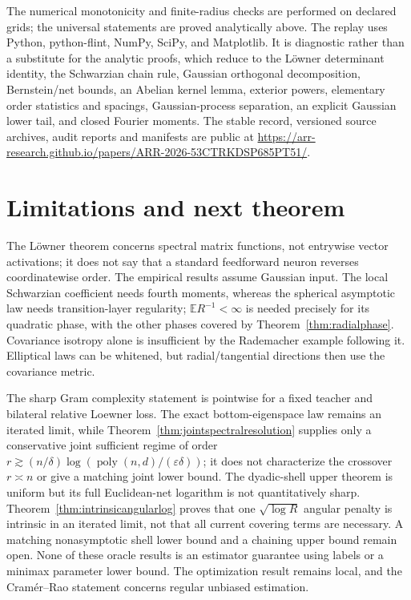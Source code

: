 \documentclass[11pt]{article}
\newcommand{\E}{\mathbb E}
\begin{document}
The numerical monotonicity and finite-radius checks are performed on declared grids; the universal statements are
proved analytically above.  The replay uses Python, python-flint, NumPy, SciPy, and Matplotlib.  It is diagnostic
rather than a substitute for
the analytic proofs, which reduce to the L\"owner determinant identity, the Schwarzian chain rule, Gaussian
orthogonal decomposition, Bernstein/net bounds, an Abelian kernel lemma, exterior powers, elementary order
statistics and spacings, Gaussian-process separation, an explicit Gaussian lower tail, and closed Fourier moments.
The stable record, versioned source archives, audit reports and manifests are public at
\url{https://arr-research.github.io/papers/ARR-2026-53CTRKDSP685PT51/}.

\section{Limitations and next theorem}

The L\"owner theorem concerns spectral matrix functions, not entrywise vector activations; it does not say that a
standard feedforward neuron reverses coordinatewise order.  The empirical results assume Gaussian input.  The
local Schwarzian coefficient needs fourth moments, whereas the spherical asymptotic law needs transition-layer
regularity; $\E R^{-1}<\infty$ is needed precisely for its quadratic phase, with the other phases covered by
Theorem~\ref{thm:radialphase}.  Covariance isotropy alone is insufficient by the Rademacher example following it.
Elliptical laws can be whitened, but radial/tangential directions then use the covariance metric.

The sharp Gram complexity statement is pointwise for a fixed teacher and bilateral relative Loewner loss.  The exact
bottom-eigenspace law remains an iterated limit, while Theorem~\ref{thm:jointspectralresolution} supplies only a
conservative joint sufficient regime of order
$r\gtrsim(n/\delta)\log(\operatorname{poly}(n,d)/(\varepsilon\delta))$; it does not characterize the crossover
$r\asymp n$ or give a matching joint lower bound.  The dyadic-shell upper theorem is uniform but its full
Euclidean-net logarithm is not quantitatively sharp.  Theorem~\ref{thm:intrinsicangularlog} proves that one
$\sqrt{\log R}$ angular penalty is intrinsic in an iterated limit, not that all current covering terms are necessary.
A matching nonasymptotic shell lower bound and a chaining upper bound remain open.
None of these oracle results is an estimator guarantee using labels or a minimax parameter lower bound.  The
optimization result remains local, and the Cram\'er--Rao statement concerns regular unbiased estimation.
\end{document}
